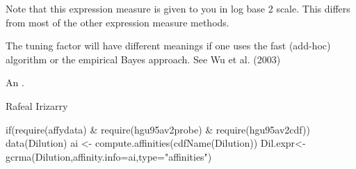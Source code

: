 \begin{Details}\relax
Note that this expression measure is given to you in log base 2
scale. This differs from most of the other expression measure
methods.

The tuning factor  will have different meanings if one uses
the fast (add-hoc) algorithm or the empirical Bayes approach. See Wu
et al. (2003)
\end{Details}
\begin{Value}
An .
\end{Value}
\begin{Author}\relax
Rafeal Irizarry
\end{Author}
\begin{Examples}
\begin{ExampleCode}
if(require(affydata) & require(hgu95av2probe) & require(hgu95av2cdf)){
     data(Dilution)
     ai <- compute.affinities(cdfName(Dilution))
     Dil.expr<-gcrma(Dilution,affinity.info=ai,type="affinities")
}
\end{ExampleCode}
\end{Examples}

